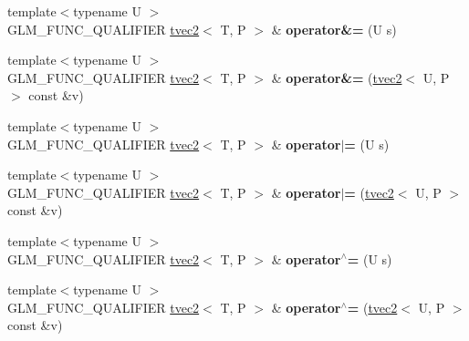 \begin{DoxyCompactItemize}
\item 
{\footnotesize template$<$typename U $>$ }\\G\+L\+M\+\_\+\+F\+U\+N\+C\+\_\+\+Q\+U\+A\+L\+I\+F\+I\+ER \hyperlink{structglm_1_1detail_1_1tvec2}{tvec2}$<$ T, P $>$ \& {\bfseries operator\&=} (U s)\hypertarget{structglm_1_1detail_1_1tvec2_a33ed3ceda999a3046030a1a918b96ddc}{}\label{structglm_1_1detail_1_1tvec2_a33ed3ceda999a3046030a1a918b96ddc}

\item 
{\footnotesize template$<$typename U $>$ }\\G\+L\+M\+\_\+\+F\+U\+N\+C\+\_\+\+Q\+U\+A\+L\+I\+F\+I\+ER \hyperlink{structglm_1_1detail_1_1tvec2}{tvec2}$<$ T, P $>$ \& {\bfseries operator\&=} (\hyperlink{structglm_1_1detail_1_1tvec2}{tvec2}$<$ U, P $>$ const \&v)\hypertarget{structglm_1_1detail_1_1tvec2_ae1d8d56ac7b3d9278f9348d89f3ff96e}{}\label{structglm_1_1detail_1_1tvec2_ae1d8d56ac7b3d9278f9348d89f3ff96e}

\item 
{\footnotesize template$<$typename U $>$ }\\G\+L\+M\+\_\+\+F\+U\+N\+C\+\_\+\+Q\+U\+A\+L\+I\+F\+I\+ER \hyperlink{structglm_1_1detail_1_1tvec2}{tvec2}$<$ T, P $>$ \& {\bfseries operator$\vert$=} (U s)\hypertarget{structglm_1_1detail_1_1tvec2_aaeea420df82cbb94b83d702248f1071d}{}\label{structglm_1_1detail_1_1tvec2_aaeea420df82cbb94b83d702248f1071d}

\item 
{\footnotesize template$<$typename U $>$ }\\G\+L\+M\+\_\+\+F\+U\+N\+C\+\_\+\+Q\+U\+A\+L\+I\+F\+I\+ER \hyperlink{structglm_1_1detail_1_1tvec2}{tvec2}$<$ T, P $>$ \& {\bfseries operator$\vert$=} (\hyperlink{structglm_1_1detail_1_1tvec2}{tvec2}$<$ U, P $>$ const \&v)\hypertarget{structglm_1_1detail_1_1tvec2_a452fee00c19e71d024421a21bb4f3854}{}\label{structglm_1_1detail_1_1tvec2_a452fee00c19e71d024421a21bb4f3854}

\item 
{\footnotesize template$<$typename U $>$ }\\G\+L\+M\+\_\+\+F\+U\+N\+C\+\_\+\+Q\+U\+A\+L\+I\+F\+I\+ER \hyperlink{structglm_1_1detail_1_1tvec2}{tvec2}$<$ T, P $>$ \& {\bfseries operator$^\wedge$=} (U s)\hypertarget{structglm_1_1detail_1_1tvec2_a0c67c4ec90c7f05f1e509f77c78cc794}{}\label{structglm_1_1detail_1_1tvec2_a0c67c4ec90c7f05f1e509f77c78cc794}

\item 
{\footnotesize template$<$typename U $>$ }\\G\+L\+M\+\_\+\+F\+U\+N\+C\+\_\+\+Q\+U\+A\+L\+I\+F\+I\+ER \hyperlink{structglm_1_1detail_1_1tvec2}{tvec2}$<$ T, P $>$ \& {\bfseries operator$^\wedge$=} (\hyperlink{structglm_1_1detail_1_1tvec2}{tvec2}$<$ U, P $>$ const \&v)\hypertarget{structglm_1_1detail_1_1tvec2_a78b9cb7b25ea115e5403e0e83692249a}{}\label{structglm_1_1detail_1_1tvec2_a78b9cb7b25ea115e5403e0e83692249a}


\end{DoxyCompactItemize}

